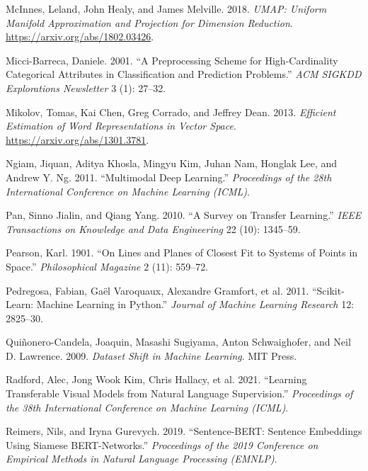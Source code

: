 \begin{CSLReferences}{1}{1}
McInnes, Leland, John Healy, and James Melville. 2018. \emph{{UMAP}: Uniform Manifold Approximation and Projection for Dimension Reduction}. \url{https://arxiv.org/abs/1802.03426}.

Micci-Barreca, Daniele. 2001. {``A Preprocessing Scheme for High-Cardinality Categorical Attributes in Classification and Prediction Problems.''} \emph{ACM SIGKDD Explorations Newsletter} 3 (1): 27--32.

Mikolov, Tomas, Kai Chen, Greg Corrado, and Jeffrey Dean. 2013. \emph{Efficient Estimation of Word Representations in Vector Space}. \url{https://arxiv.org/abs/1301.3781}.

Ngiam, Jiquan, Aditya Khosla, Mingyu Kim, Juhan Nam, Honglak Lee, and Andrew Y. Ng. 2011. {``Multimodal Deep Learning.''} \emph{Proceedings of the 28th International Conference on Machine Learning (ICML)}.

Pan, Sinno Jialin, and Qiang Yang. 2010. {``A Survey on Transfer Learning.''} \emph{IEEE Transactions on Knowledge and Data Engineering} 22 (10): 1345--59.

Pearson, Karl. 1901. {``On Lines and Planes of Closest Fit to Systems of Points in Space.''} \emph{Philosophical Magazine} 2 (11): 559--72.

Pedregosa, Fabian, Gaël Varoquaux, Alexandre Gramfort, et al. 2011. {``Scikit-Learn: Machine Learning in {P}ython.''} \emph{Journal of Machine Learning Research} 12: 2825--30.

Quiñonero-Candela, Joaquin, Masashi Sugiyama, Anton Schwaighofer, and Neil D. Lawrence. 2009. \emph{Dataset Shift in Machine Learning}. MIT Press.

Radford, Alec, Jong Wook Kim, Chris Hallacy, et al. 2021. {``Learning Transferable Visual Models from Natural Language Supervision.''} \emph{Proceedings of the 38th International Conference on Machine Learning (ICML)}.

Reimers, Nils, and Iryna Gurevych. 2019. {``Sentence-{BERT}: Sentence Embeddings Using Siamese {BERT}-Networks.''} \emph{Proceedings of the 2019 Conference on Empirical Methods in Natural Language Processing (EMNLP)}.


\end{CSLReferences}
